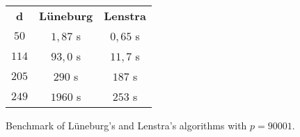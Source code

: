 \documentclass[a4paper,11pt]{article}
\theoremstyle{break}
\theoremstyle{sc}
\theoremstyle{definition}
\theoremstyle{remark}
\begin{document}
  \begin{figure}
\begin{center}
    \begin{tabular}{ccc}
      \textbf{d} & \textbf{Lüneburg} & \textbf{Lenstra} \\ 
     $50$ & $1,87$ s & $0,65$ s \\
     $114$ & $93,0$ s  & $11,7$ s \\
     $205$ & $290$ s & $187$ s \\
     $249$ & $1960$ s & $253$ s 
    \end{tabular}
    \caption{Benchmark of Lüneburg's and Lenstra's algorithms with $p=90001$.}
    \label{LuneburgLenstra}
\end{center}
  \end{figure}


\clearpage


\end{document}

